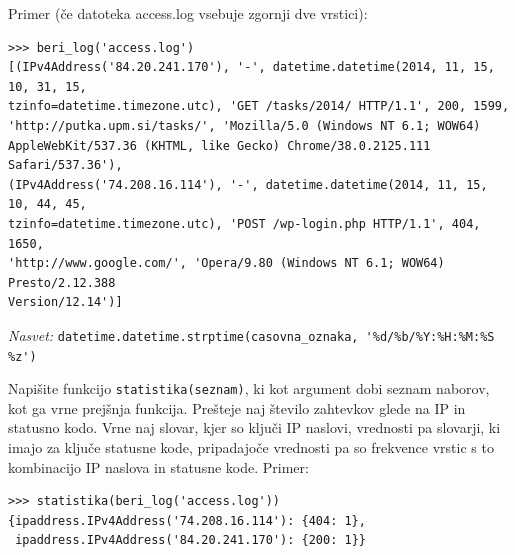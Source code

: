\documentclass[arhiv]{../izpit}
\begin{document}
\vspace{0.5\baselineskip}
\noindent Primer (če datoteka access.log vsebuje zgornji dve vrstici):
%
\begin{verbatim}
>>> beri_log('access.log')
[(IPv4Address('84.20.241.170'), '-', datetime.datetime(2014, 11, 15, 10, 31, 15,
tzinfo=datetime.timezone.utc), 'GET /tasks/2014/ HTTP/1.1', 200, 1599,
'http://putka.upm.si/tasks/', 'Mozilla/5.0 (Windows NT 6.1; WOW64)
AppleWebKit/537.36 (KHTML, like Gecko) Chrome/38.0.2125.111 Safari/537.36'),
(IPv4Address('74.208.16.114'), '-', datetime.datetime(2014, 11, 15, 10, 44, 45,
tzinfo=datetime.timezone.utc), 'POST /wp-login.php HTTP/1.1', 404, 1650,
'http://www.google.com/', 'Opera/9.80 (Windows NT 6.1; WOW64) Presto/2.12.388
Version/12.14')]
\end{verbatim}

\noindent\emph{Nasvet:}
\verb+datetime.datetime.strptime(casovna_oznaka, '%d/%b/%Y:%H:%M:%S %z')+

\podnaloga[15 točk]
Napišite funkcijo \texttt{statistika(seznam)}, ki kot argument dobi seznam naborov, kot ga vrne prejšnja funkcija. Prešteje naj število zahtevkov glede na IP in statusno kodo. Vrne naj slovar, kjer so ključi IP naslovi, vrednosti pa slovarji, ki imajo za ključe statusne kode, pripadajoče vrednosti pa so frekvence vrstic s to kombinacijo IP naslova in statusne kode. Primer:
\begin{verbatim}
>>> statistika(beri_log('access.log'))
{ipaddress.IPv4Address('74.208.16.114'): {404: 1},
 ipaddress.IPv4Address('84.20.241.170'): {200: 1}}
\end{verbatim}
\end{document}
